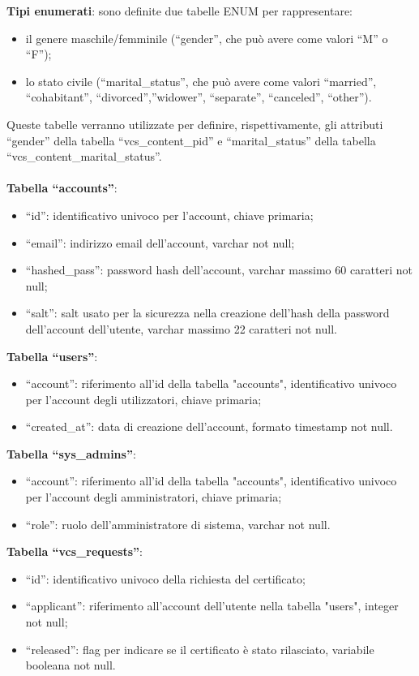 \textbf{Tipi enumerati}: sono definite due tabelle ENUM per rappresentare:
\begin{itemize}
    \item il genere maschile/femminile (“gender”, che può avere come valori “M” o “F”);
    \item lo stato civile (“marital\_status”, che può avere come valori “married”, “cohabitant”, “divorced”,”widower”, “separate”, “canceled”, “other”).
\end{itemize}
Queste tabelle verranno utilizzate per definire, rispettivamente, gli attributi “gender” della tabella “vcs\_content\_pid” e “marital\_status” della tabella “vcs\_content\_marital\_status”.\\\\

\textbf{Tabella “accounts”}:
\begin{itemize}
    \item “id”: identificativo univoco per l’account, chiave primaria; 
    \item “email”: indirizzo email dell’account, varchar not null;
    \item “hashed\_pass”: password hash dell’account, varchar massimo 60 caratteri not null;
    \item “salt”: salt usato per la sicurezza nella creazione dell’hash della password dell’account dell’utente, varchar massimo 22 caratteri not null.
\end{itemize}

\textbf{Tabella “users”}:
\begin{itemize}
    \item “account”: riferimento all'id della tabella "accounts", identificativo univoco per l’account degli utilizzatori,  chiave primaria;
    \item “created\_at”: data di creazione dell’account, formato timestamp not null. 
\end{itemize}

\textbf{Tabella “sys\_admins”}:
\begin{itemize}
    \item “account”: riferimento all'id della tabella "accounts", identificativo univoco per l’account degli amministratori,  chiave primaria; 
    \item “role”: ruolo dell'amministratore di sistema, varchar not null.
\end{itemize}

\textbf{Tabella “vcs\_requests”}:
\begin{itemize}
    \item “id”: identificativo univoco della richiesta del certificato; 
    \item “applicant”: riferimento all'account dell'utente nella tabella "users", integer not null;  
    \item “released”: flag per indicare se il certificato è stato rilasciato, variabile booleana not null. 
\end{itemize}

